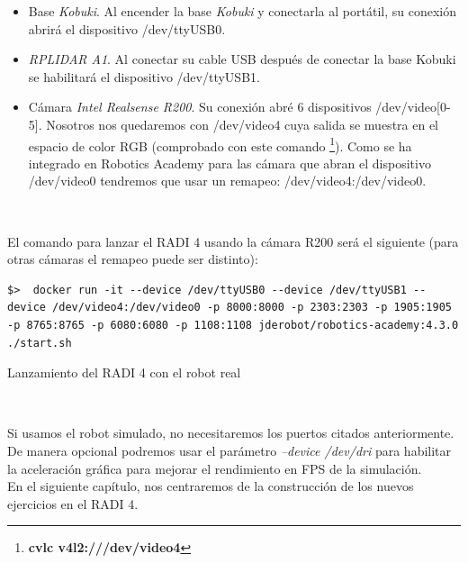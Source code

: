 \begin{itemize}
	\item Base \textit{Kobuki}. Al encender la base \textit{Kobuki} y conectarla al portátil, su conexión abrirá el dispositivo /dev/ttyUSB0.
	\item \textit{RPLIDAR A1}. Al conectar su cable USB después de conectar la base Kobuki se habilitará el dispositivo /dev/ttyUSB1.
	\item Cámara \textit{Intel Realsense R200}. Su conexión abré 6 dispositivos /dev/video[0-5]. Nosotros nos quedaremos con /dev/video4 cuya salida se muestra en el espacio de color RGB (comprobado con este comando \footnote{\textbf{cvlc v4l2:///dev/video4}}). Como se ha integrado en Robotics Academy para las cámara que abran el dispositivo /dev/video0 tendremos que usar un remapeo: /dev/video4:/dev/video0.
\end{itemize}\

El comando para lanzar el RADI 4 usando la cámara R200 será el siguiente (para otras cámaras el remapeo puede ser distinto):\\

\begin{code}[H]
\begin{lstlisting}
$>  docker run -it --device /dev/ttyUSB0 --device /dev/ttyUSB1 --device /dev/video4:/dev/video0 -p 8000:8000 -p 2303:2303 -p 1905:1905 -p 8765:8765 -p 6080:6080 -p 1108:1108 jderobot/robotics-academy:4.3.0 ./start.sh
\end{lstlisting}
\caption{Lanzamiento del RADI 4 con el robot real}
\label{cod:lanzamiento_radi_robot_real}
\end{code}\

Si usamos el robot simulado, no necesitaremos los puertos citados anteriormente. De manera opcional podremos usar el parámetro \textit{--device /dev/dri} para habilitar la aceleración gráfica para mejorar el rendimiento en FPS de la simulación.\\

En el siguiente capítulo, nos centraremos de la construcción de los nuevos ejercicios en el RADI 4.




